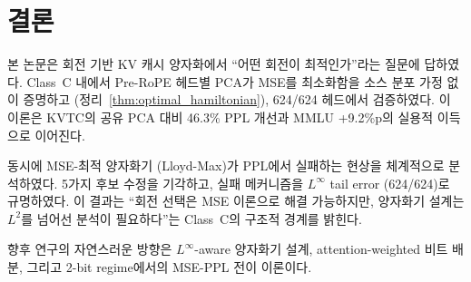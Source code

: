 \section{결론}
\label{sec:conclusion}

본 논문은 회전 기반 KV 캐시 양자화에서 ``어떤 회전이 최적인가''라는 질문에 답하였다. Class~C 내에서 Pre-RoPE 헤드별 PCA가 MSE를 최소화함을 소스 분포 가정 없이 증명하고 (정리~\ref{thm:optimal_hamiltonian}), 624/624 헤드에서 검증하였다. 이 이론은 KVTC의 공유 PCA 대비 46.3\% PPL 개선과 MMLU +9.2\%p의 실용적 이득으로 이어진다.

동시에 MSE-최적 양자화기 (Lloyd-Max)가 PPL에서 실패하는 현상을 체계적으로 분석하였다. 5가지 후보 수정을 기각하고, 실패 메커니즘을 $L^\infty$ tail error (624/624)로 규명하였다. 이 결과는 ``회전 선택은 MSE 이론으로 해결 가능하지만, 양자화기 설계는 $L^2$를 넘어선 분석이 필요하다''는 Class~C의 구조적 경계를 밝힌다.

향후 연구의 자연스러운 방향은 $L^\infty$-aware 양자화기 설계, attention-weighted 비트 배분, 그리고 2-bit regime에서의 MSE-PPL 전이 이론이다.
